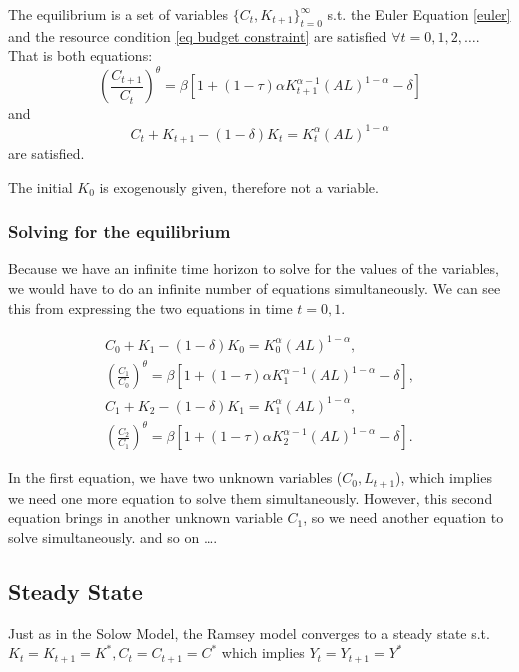 \documentclass[11pt]{article}
\begin{document}
\begin{shaded}
    The equilibrium is a set of variables $\{C_t, K_{t+1}\}_{t=0}^\infty$ s.t. the Euler Equation \eqref{euler} and the resource condition \eqref{eq budget constraint} are satisfied $\forall t = 0,1,2,\ldots$. That is both equations:
    \[\left(\frac{C_{t+1}}{C_t}\right)^\theta=\beta\left[1+(1-\tau) \alpha K_{t+1}^{\alpha-1}(A L)^{1-\alpha}-\delta\right]\]
    and
    \[C_t + K_{t+1} - (1-\delta)K_t = K_t^\alpha(AL)^{1-\alpha}\]
    are satisfied.
    \begin{note}
        The initial $K_0$ is exogenously given, therefore not a variable.
    \end{note}
\end{shaded}

\subsubsection{Solving for the equilibrium}

Because we have an infinite time horizon to solve for the values of the variables, we would have to do an infinite number of equations simultaneously. We can see this from expressing the two equations in time $t=0,1$.

\begin{equation}
\begin{gathered}
C_0+K_1-(1-\delta) K_0=K_0^\alpha(A L)^{1-\alpha}, \\
\left(\frac{C_1}{C_0}\right)^\theta=\beta\left[1+(1-\tau) \alpha K_1^{\alpha-1}(A L)^{1-\alpha}-\delta\right], \\
C_1+K_2-(1-\delta) K_1=K_1^\alpha(A L)^{1-\alpha}, \\
\left(\frac{C_2}{C_1}\right)^\theta=\beta\left[1+(1-\tau) \alpha K_2^{\alpha-1}(A L)^{1-\alpha}-\delta\right] .
\end{gathered}
\end{equation}

In the first equation, we have two unknown variables ($C_0, L_{t+1}$), which implies we need one more equation to solve them simultaneously. However, this second equation brings in another unknown variable $C_1$, so we need another equation to solve simultaneously. and so on \ldots.

\subsection{Steady State}

Just as in the Solow Model, the Ramsey model converges to a steady state s.t. $K_t = K_{t+1} = K^*, C_t = C_{t+1} = C^*$ which implies $Y_t = Y_{t+1} = Y^*$
\end{document}
